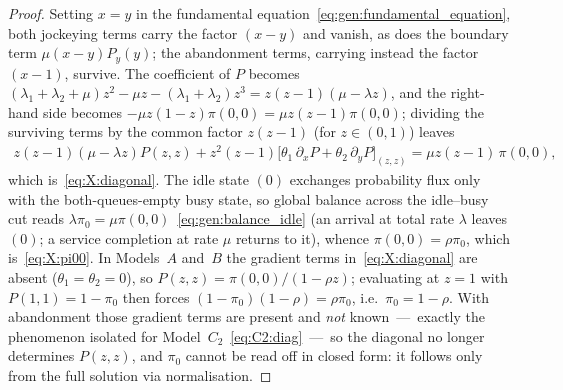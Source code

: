 \begin{proof}
    Setting $x=y$ in the fundamental
    equation~\eqref{eq:gen:fundamental_equation}, both jockeying terms carry the factor
    $(x-y)$ and vanish, as does the boundary term $\mu(x-y)P_y(y)$; the abandonment
    terms, carrying instead the factor $(x-1)$, survive. The coefficient of $P$ becomes
    $(\lambda_1+\lambda_2+\mu)z^2-\mu z-(\lambda_1+\lambda_2)z^3 = z(z-1)(\mu-\lambda z)$,
    and the right-hand side becomes $-\mu z(1-z)\pi(0,0)=\mu z(z-1)\pi(0,0)$; dividing
    the surviving terms by the common factor $z(z-1)$ (for $z\in(0,1)$) leaves
    \begin{align}
        z(z-1)(\mu-\lambda z)P(z,z)
        + z^2(z-1)\bigl[\theta_1\,\partial_x P + \theta_2\,\partial_y P\bigr]_{(z,z)}
        = \mu z(z-1)\,\pi(0,0),
        \label{eq:X:diagonal_full}
    \end{align}
    which is~\eqref{eq:X:diagonal}. The idle state $(0)$ exchanges probability flux only
    with the both-queues-empty busy state, so global balance across the idle--busy cut
    reads $\lambda\pi_0=\mu\pi(0,0)$~\eqref{eq:gen:balance_idle} (an arrival at total rate
    $\lambda$ leaves $(0)$; a service completion at rate $\mu$ returns to it), whence
    $\pi(0,0)=\rho\pi_0$, which is~\eqref{eq:X:pi00}. In Models~$A$ and~$B$ the gradient
    terms in~\eqref{eq:X:diagonal} are absent ($\theta_1=\theta_2=0$), so
    $P(z,z)=\pi(0,0)/(1-\rho z)$; evaluating at $z=1$ with $P(1,1)=1-\pi_0$ then forces
    $(1-\pi_0)(1-\rho)=\rho\pi_0$, i.e.\ $\pi_0=1-\rho$. With abandonment those gradient
    terms are present and \emph{not} known~---~exactly the phenomenon isolated for
    Model~$C_2$~\eqref{eq:C2:diag}~---~so the diagonal no longer determines $P(z,z)$, and
    $\pi_0$ cannot be read off in closed form: it follows only from the full solution
    via normalisation.
\end{proof}

